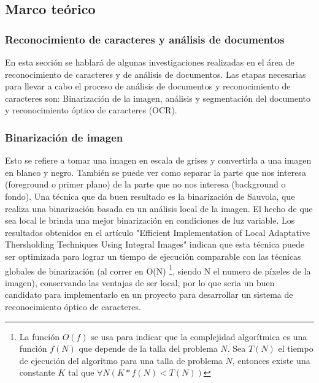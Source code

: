 \documentclass[a4paper, 11pt, oneside]{article}
\begin{document}
	\subsection {Marco teórico}
	\subsubsection{Reconocimiento de caracteres y análisis de documentos}
	En esta sección se hablará de algunas investigaciones realizadas en el área
	de reconocimiento de caracteres y de análisis de documentos.
	Las etapas necesarias para llevar a cabo el proceso de análisis de documentos
	y reconocimiento de caracteres son: Binarización de la imagen, análisis y
	segmentación del documento y reconocimiento óptico de caracteres (OCR).
	
	\subsubsection{Binarización de imagen}
	Esto se refiere a tomar una imagen en escala de grises y convertirla a una 
	imagen en blanco y negro. También se puede ver como separar la parte que nos interesa
	(foreground o primer plano) de la parte que no nos interesa (background o fondo).
	Una técnica que da buen resultado es la binarización de Sauvola,
	que realiza una binarización basada en un análisis local de la imagen. El hecho de
	que sea local le brinda una mejor binarización en condiciones de luz variable. Los 
    resultados obtenidos en el artículo "Efficient Implementation of Local Adaptative 
    Thersholding Techniques Using Integral Images" indican que esta técnica puede ser
    optimizada para lograr un tiempo de ejecución comparable con las técnicas globales de 
    binarización (al correr en O(N) \footnote{La función $O(f)$ se usa para indicar que la complejidad
    algorítmica es una función $f(N)$ que depende de la talla del problema $N$. Sea $T(N)$ el tiempo de 
    ejecución del algoritmo para una talla de problema $N$, entonces existe una constante $K$ tal que 
    $\forall N ( K*f(N) < T(N) ) $}, siendo N el numero de píxeles de la imagen),
    conservando	las ventajas de ser local, por lo que seria un buen candidato para implementarlo en un 
    proyecto para desarrollar un sistema de reconocimiento óptico de caracteres.
	
\end{document}
